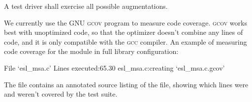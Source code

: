 A test driver shall exercise all possible augmentations.

We currently use the GNU \textsc{gcov} program to measure code
coverage. \textsc{gcov} works best with unoptimized code, so that the
optimizer doesn't combine any lines of code, and it is only compatible
with the \textsc{gcc} compiler. An example of measuring code coverage
for the  module in full library configuration:

\begin{cchunk}
  File `esl_msa.c'
  Lines executed:65.30%
  esl_msa.c:creating `esl_msa.c.gcov'
\end{cchunk}

The file  contains an annotated source listing
of the  file, showing which lines were and weren't covered
by the test suite.



